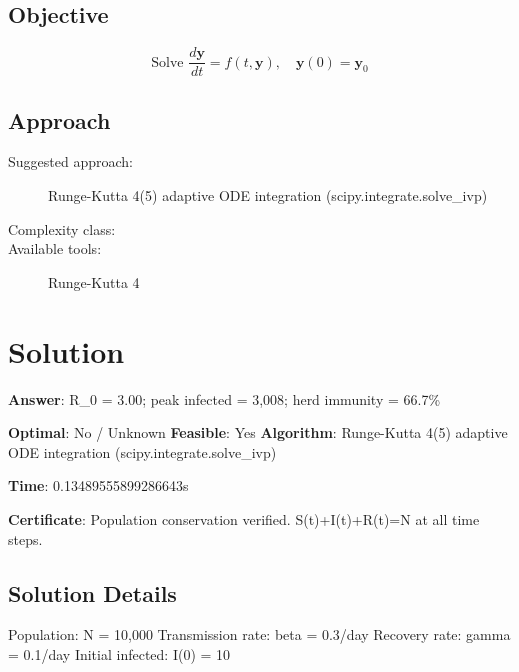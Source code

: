 \documentclass[11pt, a4paper]{article}
\begin{document}
\subsection{Objective}

\begin{equation}
\text{Solve } \frac{d\mathbf{y}}{dt} = f(t, \mathbf{y}), \quad \mathbf{y}(0) = \mathbf{y}_0
\end{equation}

\subsection{Approach}

\begin{description}
  \item[Suggested approach:] Runge-Kutta 4(5) adaptive ODE integration (scipy.integrate.solve\_ivp)
  \item[Complexity class:] 
  \item[Available tools:] Runge-Kutta 4
\end{description}
\section{Solution}

\begin{polyaresult}

\textbf{Answer}: R\_0 = 3.00; peak infected = 3,008; herd immunity = 66.7\%


\textbf{Optimal}: No / Unknown \hfill
\textbf{Feasible}: Yes
\textbf{Algorithm}: Runge-Kutta 4(5) adaptive ODE integration (scipy.integrate.solve\_ivp) \quad $$

\textbf{Time}: 0.13489555899286643s

\textbf{Certificate}: Population conservation verified. S(t)+I(t)+R(t)=N at all time steps.

\end{polyaresult}

\subsection{Solution Details}

Population: N = 10,000
Transmission rate: beta = 0.3/day
Recovery rate: gamma = 0.1/day
Initial infected: I(0) = 10
\end{document}
